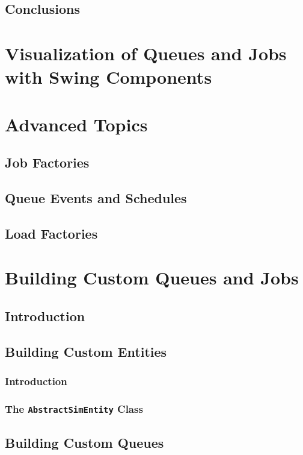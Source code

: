 \documentclass[12pt]{book}
\begin{document}
\section{Conclusions}

\chapter{Visualization of Queues and Jobs with Swing Components}

\chapter{Advanced Topics}

\section{Job Factories}

\section{Queue Events and Schedules}

\section{Load Factories}

\chapter{Building Custom Queues and Jobs}

\section{Introduction}

\section{Building Custom Entities}

\subsection{Introduction}

\subsection{The \lstinline{AbstractSimEntity} Class}

\section{Building Custom Queues}
\end{document}
